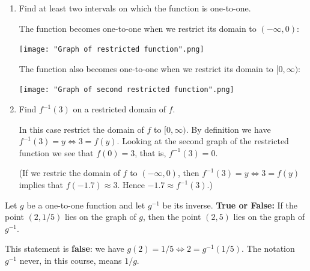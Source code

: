 \documentclass[nooutcomes]{ximera}
\begin{document}
\begin{problem}
\begin{enumerate}
    \item
      Find at least two intervals on which the function is one-to-one.
      \begin{freeResponse}
        The function becomes one-to-one when we restrict its domain to $(-\infty, 0)$:
        \begin{image}
          \texttt{[image: "Graph of restricted function".png]}
        \end{image}
        The function also becomes one-to-one when we restrict its domain to $[0, \infty)$:
        \begin{image}
          \texttt{[image: "Graph of second restricted function".png]}
        \end{image}
      \end{freeResponse}

    \item
      Find $f^{-1}(3)$ on a restricted domain of $f$.
      \begin{freeResponse}
        In this case restrict the domain of $f$ to $[0, \infty)$.
        By definition we have $f^{-1}(3) = y \iff 3 = f(y)$.
        Looking at the second graph of the restricted function we see that $f(0) = 3$, that is, $f^{-1}(3) = 0$.

        (If we restric the domain of $f$ to $(-\infty, 0)$, then $f^{-1}(3) = y \iff 3 = f(y)$ implies that $f(-1.7) \approx 3$.
        Hence $-1.7 \approx f^{-1}(3)$.)
      \end{freeResponse}
  \end{enumerate}
\end{problem}

\begin{problem}

  Let $g$ be a one-to-one function and let $g^{-1}$ be its inverse.
  \textbf{True or False:}
  If the point $(2, 1/5)$ lies on the graph of $g$, then the point $(2, 5)$ lies on the graph of $g^{-1}$.
  \begin{freeResponse}
    This statement is \textbf{false}: we have $g(2) = 1/5 \iff 2 = g^{-1}(1/5)$.
    The notation $g^{-1}$ never, in this course, means $1/g$.
  \end{freeResponse}
\end{problem}
\end{document}
